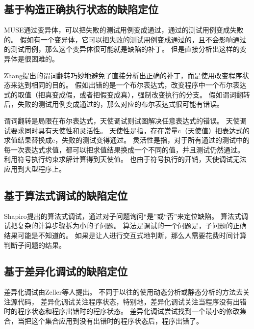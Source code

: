 \subsection{基于构造正确执行状态的缺陷定位}

MUSE通过变异体，可以把失败的测试用例变成通过，通过的测试用例变成失败的。
假如有一个变异体，它可以把失败的测试用例变成通过的，且不会影响通过的测试用例，那么这个变异体很可能就是缺陷的补丁。
但是直接分析出这样的变异体是很困难的。

Zhang提出的谓词翻转\parencite{Zhang2006Locating}巧妙地避免了直接分析出正确的补丁，而是使用改变程序状态来达到相同的目的。
假如出错的是一个布尔表达式，改变程序中一个布尔表达式的取值（把真变成假，或者把假变成真），强制改变执行的分支。
假如谓词翻转后，失败的测试用例变成通过的，那么对应的布尔表达式很可能有错误。

谓词翻转是局限在布尔表达式，天使调试\parencite{Chandra2011Angelic}则试图解决任意表达式的错误。
天使调试要求同时具有天使性和灵活性。
天使性是指，存在常量c（天使值）把表达式的求值结果替换成c，失败的测试变得通过。
灵活性是指，对于所有通过的测试中的每一次表达式求值，都可以把求值结果换成一个不同的值，并且测试仍然通过。
利用符号执行约束求解计算得到天使值。
也由于符号执行的开销，天使调试无法应用到大型程序上。

\subsection{基于算法式调试的缺陷定位}

Shapiro提出的算法式调试\parencite{Shapiro1982Algorithmic}，通过对子问题询问“是”或“否”来定位缺陷。
算法式调试把复杂的计算步骤拆为小的子问题。
算法是调试的一个问题是，子问题的正确结果可能是不知道的。
如果是让人进行交互式地判断，那么人需要花费时间计算判断子问题的结果。

\subsection{基于差异化调试的缺陷定位}

差异化调试由Zeller等人提出\parencite{Zeller2002Isolating,Zeller2002Simplifying}。
不同于以往的使用动态分析或静态分析的方法去关注源代码，
差异化调试关注程序状态，特别地，差异化调试关注当程序没有出错时的程序状态和程序出错时的程序状态。
差异化调试尝试找到一个最小的修改集合，当把这个集合应用到没有出错时的程序状态后，程序出错了。

